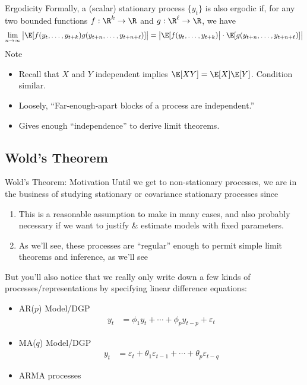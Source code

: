 \documentclass[aspectratio=169, handout]{beamer}
\newcommand{\ra}{\rightarrow}
\begin{document}
{\footnotesize
\begin{frame}{Ergodicity}
Formally, a (scalar) stationary process $\{y_t\}$ is also
\alert{ergodic} if, for any two bounded functions $f:\R^k\ra \R$ and
$g:\R^\ell \ra \R$, we have
\begin{align*}
  \lim_{n\ra\infty}
  \big|
  \E[
    f(y_t,\ldots,y_{t+k})
    g(y_{t+n},\ldots,y_{t+n+\ell})
  ]
  \big|
  =
  \big|
  \E[
    f(y_t,\ldots,y_{t+k})
  \big|
  \cdot
  \E[
    g(y_{t+n},\ldots,y_{t+n+\ell})
  ]
  \big|
\end{align*}
Note
\begin{itemize}
  \item Recall that $X$ and $Y$ independent implies $\E[XY]=\E[X]\E[Y]$.
    Condition similar.
  \pause
  \item Loosely, ``Far-enough-apart blocks of a process are
    independent.''
  \pause
  \item Gives enough ``independence'' to derive limit theorems.
\end{itemize}
\end{frame}
}


\subsection{Wold's Theorem}



{\footnotesize
\begin{frame}{Wold's Theorem: Motivation}
Until we get to non-stationary processes, we are in the business of
studying \alert{stationary} or \alert{covariance stationary processes}
since
\begin{enumerate}
  \item This is a reasonable assumption to make in many cases,
    and also probably necessary if we want to justify \& estimate models
    with fixed parameters.
  \item As we'll see, these processes are ``regular'' enough to permit
    simple limit theorems and inference, as we'll see
\end{enumerate}
\pause
But you'll also notice that we really only write down \alert{a few}
kinds of processes/representations by specifying linear difference
equations:
\begin{itemize}
  \item AR($p$) Model/DGP
    \begin{align*}
      y_t &= \phi_1 y_t + \cdots + \phi_p y_{t-p} + \varepsilon_t
    \end{align*}

  \item MA($q$) Model/DGP
    \begin{align*}
      y_t
      &=
      \varepsilon_t
      +
      \theta_1 \varepsilon_{t-1}
      + \cdots + \theta_p \varepsilon_{t-q}
    \end{align*}

  \item ARMA processes
\end{itemize}
\end{frame}
}
\end{document}
